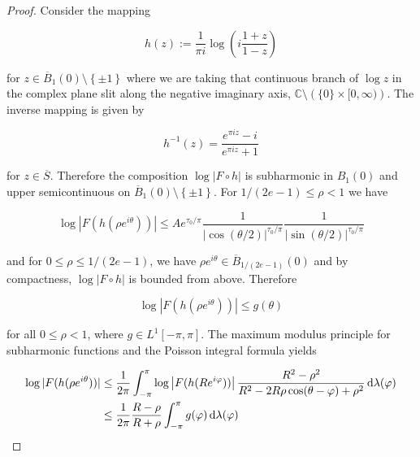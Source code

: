 \begin{proof}
	Consider the mapping 

	\begin{equation*}
		h(z) := \frac{1}{\pi i}\log\left( i\frac{1 + z}{1 - z} \right)
	\end{equation*}

	\noindent for $z \in \overline{B}_1(0) \setminus \left\{ \pm 1\right\}$ where we are taking that continuous branch of $\log z$ in the complex plane slit along the negative imaginary axis, $\mathbb{C} \setminus\left(\{0\} \times [0,\infty)\right)$. The inverse mapping is given by 

	\begin{equation*}
		h^{-1}(z) = \frac{e^{\pi i z} - i}{e^{\pi i z} + 1}
	\end{equation*}

	\noindent for $z \in \overline{S}$. Therefore the composition $\log\left| F \circ h\right|$ is subharmonic in $B_1(0)$ and upper semicontinuous on $\overline{B}_1(0)\setminus\left\{ \pm 1\right\}$. For $1/(2e - 1) \leq \rho < 1$ we have 
	
	\begin{equation*}
		\log | F(h(\rho e^{i\theta})) | \leq Ae^{\tau_0/\pi}\frac{1}{\left| \cos(\theta/2) \right|^{\tau_0/\pi}}\frac{1}{\left| \sin(\theta/2) \right|^{\tau_0/\pi}}
	\end{equation*}
	
	\noindent and for $0 \leq \rho \leq 1/(2e - 1)$, we have $\rho e^{i\theta} \in \overline{B}_{1/(2e - 1)}(0)$ and by compactness, $\log|F \circ h|$ is bounded from above. Therefore  

	\begin{equation*}
		\log | F(h(\rho e^{i\theta})) | \leq g(\theta)
	\end{equation*}

	\noindent for all $0 \leq \rho < 1$, where $g \in L^1[-\pi,\pi]$. The maximum modulus principle for subharmonic functions and the Poisson integral formula yields 

	\begin{equation*}
		\begin{aligned}
		\log| F(h(\rho e^{i\theta}))| &\leq 	\frac{1}{2\pi} \int_{-\pi}^\pi\log\left| F(h(Re^{i\varphi}))\right| \frac{R^2 - \rho^2}{R^2 - 2R\rho\cos(\theta - \varphi) + \rho^2} \mathop{}\!\mathrm{d}\lambda(\varphi)\\ 
		&\leq \frac{1}{2\pi}\frac{R - \rho}{R + \rho} \int_{-\pi}^\pi g(\varphi) \mathop{}\!\mathrm{d}\lambda(\varphi)
		\end{aligned}
	\end{equation*}


\end{proof}
